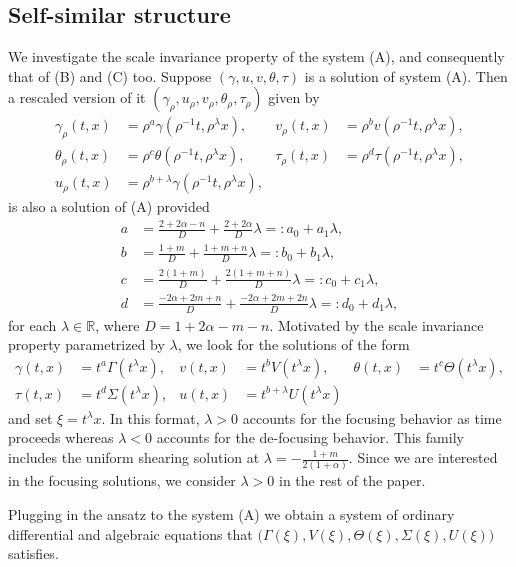 \documentclass[graybox]{svmult}
\begin{document}
\subsection{Self-similar structure}
We investigate the scale invariance property of the system (A), and consequently that of (B) and (C) too.
Suppose $(\gamma,u,v,\theta,\tau)$ is a solution of system (A). Then a rescaled version of it $(\gamma_\rho,u_\rho,v_\rho,\theta_\rho,\tau_\rho)$ given by
\begin{align*}
 \gamma_\rho(t,x) &= \rho^a\gamma(\rho^{-1}t,\rho^\lambda x), &
 v_\rho(t,x) &= \rho^bv(\rho^{-1}t,\rho^\lambda x),\\
 \theta_\rho(t,x) &= \rho^c\theta(\rho^{-1}t,\rho^\lambda x), &
 \tau_\rho(t,x) &= \rho^d\tau(\rho^{-1}t,\rho^\lambda x),\\
 u_\rho(t,x) &= \rho^{b+\lambda}\gamma(\rho^{-1}t,\rho^\lambda x),
\end{align*}
is also a solution of (A) provided
\begin{align*}
 a&= \frac{2+2\alpha-n}{D} + \frac{2+2\alpha}{D}\lambda =: a_0 + a_1 \lambda, \\
 b&=\frac{1+m}{D} + \frac{1+m+n}{D}\lambda =: b_0 + b_1\lambda,\\
 c&=\frac{2(1+m)}{D} + \frac{2(1+m+n)}{D}\lambda =: c_0 + c_1\lambda, \\
 d&=\frac{-2\alpha + 2m +n}{D} + \frac{-2\alpha+2m+2n}{D}\lambda =: d_0 + d_1\lambda,
\end{align*}
for each $\lambda \in \mathbb{R}$, where  $D = 1+2\alpha-m-n$. 
Motivated by the scale invariance property parametrized by $\lambda$, we look for the solutions of the form 
\begin{align*}
 \gamma(t,x) &= t^a\Gamma(t^\lambda x), & v(t,x) &= t^b V(t^\lambda x), &\theta(t,x) &= t^c \Theta(t^\lambda x),\\
 \tau(t,x) &= t^d \Sigma(t^\lambda x), & u(t,x) &= t^{b+\lambda} U(t^\lambda x)
\end{align*}
and set $\xi = t^\lambda x$. In this format, $\lambda>0$ accounts for the focusing behavior as time proceeds whereas $\lambda<0$ accounts for the de-focusing behavior. This family includes the uniform shearing solution at $\lambda = -\frac{1+m}{2(1+\alpha)}$. Since we are interested in the focusing solutions, we consider $\lambda>0$ in the rest of the paper.


Plugging in the ansatz to the system (A) we obtain a  system of ordinary differential and algebraic equations that $\big(\Gamma(\xi), V(\xi), \Theta(\xi), \Sigma(\xi), U(\xi)\big)$ satisfies.
\end{document}
